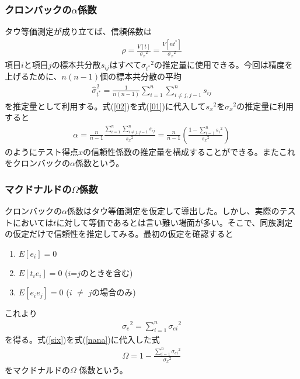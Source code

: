 \documentclass{jarticle}
\begin{document}
\subsubsection{クロンバックの$\displaystyle \alpha$係数}
タウ等価測定が成り立てば、信頼係数は
\begin{eqnarray}
  \label{01}
  \displaystyle \rho=\frac{V[t]}{{\sigma_{x}}^2}=\frac{V[nt^{\ast}]}{{\sigma_{x}}^2}
\end{eqnarray}
項目$i$と項目$j$の標本共分散$s_{ij}$はすべて$\displaystyle  {\sigma_{t^\ast}}^2$の推定量に使用できる。今回は精度を上げるために、$n(n-1)$個の標本共分散の平均
\begin{eqnarray}
  \label{02}
  \displaystyle \hat{\sigma}_{t^\ast}^2=\frac{1}{n(n-1)}\sum_{i=1}^{n} \sum_{i\neq j,j-1}^{n} s_{ij}
\end{eqnarray}
を推定量として利用する。式(\ref{02})を式(\ref{01})に代入して${s_{x}}^2$を${\sigma_{x}}^2$の推定量に利用すると
\begin{eqnarray}
  \displaystyle \alpha=\frac{n}{n-1} \frac{\sum_{i=1}^{n} \sum_{i\neq j,j-1}^{n} s_{ij}}{{s_{x}}^2}=\frac{n}{n-1} \left(\frac{1-\sum_{i=1}^{n} {s_{i}}^2} {{s_{x}}^2}\right)
\end{eqnarray}
のようにテスト得点$x$の信頼性係数の推定量を構成することができる。またこれをクロンバックの$\alpha$係数という。
\subsubsection{マクドナルドの$\displaystyle \Omega$係数}
クロンバックの$\alpha$係数はタウ等価測定を仮定して導出した。しかし、実際のテストにおいては$t$に対して等価であるとは言い難い場面が多い。そこで、同族測定の仮定だけで信頼性を推定してみる。最初の仮定を確認すると
\begin{screen}
  \begin{enumerate}
    \item  $E[e_{i}] = 0$
    \item  $E[t_{i}e_{i}] = 0$ ($i$=$j$のときを含む)
    \item  $E[e_{i}e_{j}] = 0$ ($i$ $\neq$ $j$の場合のみ)
  \end{enumerate}
\end{screen}
これより
\begin{eqnarray}
  \label{six}
  \displaystyle {\sigma_{e}}^2=\sum_{i=1}^{n} {\sigma_{ei}}^2
\end{eqnarray}
を得る。式(\ref{six})を式(\ref{nana})に代入した式
\begin{eqnarray}
  \label{08}
\displaystyle \Omega=1-\frac{\sum_{i=1}^{n} {\sigma_{ei}}^2}{{\sigma_{x}}^2}
\end{eqnarray}
をマクドナルドの$\Omega$ 係数という。
\end{document}
